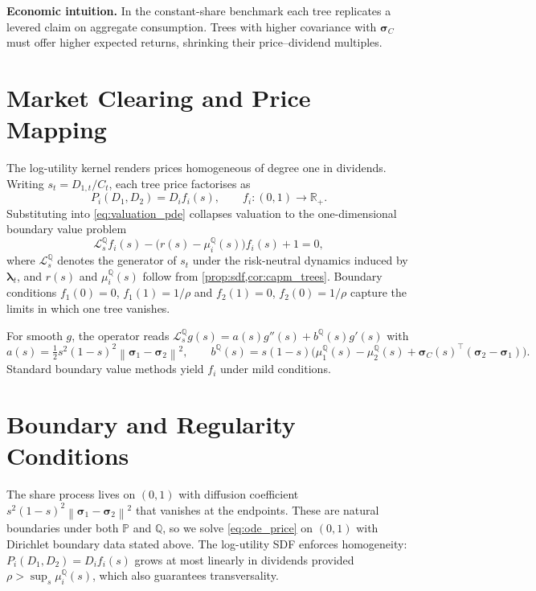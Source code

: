 ﻿\documentclass[11pt,letterpaper,oneside]{article}
\numberwithin{equation}{section}
\newcommand{\R}{\mathbb{R}}
\newcommand{\1}{\mathbf{1}}
\newcommand{\norm}[1]{\left\lVert #1\right\rVert}
\begin{document}
\begin{tcolorbox}[didacticstyle]
\textbf{Economic intuition.} In the constant-share benchmark each tree replicates a levered claim on aggregate consumption. Trees with higher covariance with $\bm{\sigma}_C$ must offer higher expected returns, shrinking their price--dividend multiples.
\end{tcolorbox}

\section{Market Clearing and Price Mapping}
The log-utility kernel renders prices homogeneous of degree one in dividends. Writing $s_t=D_{1,t}/C_t$, each tree price factorises as
\begin{equation}\label{eq:pd_ratio}
  P_i(D_1,D_2) = D_i f_i(s), \qquad f_i:(0,1)\to\R_+.
\end{equation}
Substituting into \eqref{eq:valuation_pde} collapses valuation to the one-dimensional boundary value problem
\begin{equation}\label{eq:ode_price}
  \mathcal{L}^{\mathbb{Q}}_s f_i(s) - \big(r(s)-\mu_i^{\mathbb{Q}}(s)\big) f_i(s) + 1 = 0,
\end{equation}
where $\mathcal{L}^{\mathbb{Q}}_s$ denotes the generator of $s_t$ under the risk-neutral dynamics induced by $\bm{\lambda}_t$, and $r(s)$ and $\mu_i^{\mathbb{Q}}(s)$ follow from \cref{prop:sdf,cor:capm_trees}. Boundary conditions $f_1(0)=0$, $f_1(1)=1/\rho$ and $f_2(1)=0$, $f_2(0)=1/\rho$ capture the limits in which one tree vanishes.

\begin{tcolorbox}[mathstyle]
For smooth $g$, the operator reads $\mathcal{L}^{\mathbb{Q}}_s g(s)=a(s) g''(s)+b^{\mathbb{Q}}(s) g'(s)$ with
\[
  a(s)=\tfrac12 s^2(1-s)^2\norm{\bm{\sigma}_1-\bm{\sigma}_2}^2,
  \qquad
  b^{\mathbb{Q}}(s)=s(1-s)\Big(\mu_1^{\mathbb{Q}}(s)-\mu_2^{\mathbb{Q}}(s)+\bm{\sigma}_C(s)^{\top}(\bm{\sigma}_2-\bm{\sigma}_1)\Big).
\]
Standard boundary value methods yield $f_i$ under mild conditions.
\end{tcolorbox}

\section{Boundary and Regularity Conditions}
The share process lives on $(0,1)$ with diffusion coefficient $s^2(1-s)^2\norm{\bm{\sigma}_1-\bm{\sigma}_2}^2$ that vanishes at the endpoints. These are natural boundaries under both $\mathbb{P}$ and $\mathbb{Q}$, so we solve \eqref{eq:ode_price} on $(0,1)$ with Dirichlet boundary data stated above. The log-utility SDF enforces homogeneity: $P_i(D_1,D_2)=D_i f_i(s)$ grows at most linearly in dividends provided $\rho>\sup_s \mu_i^{\mathbb{Q}}(s)$, which also guarantees transversality.
\end{document}
